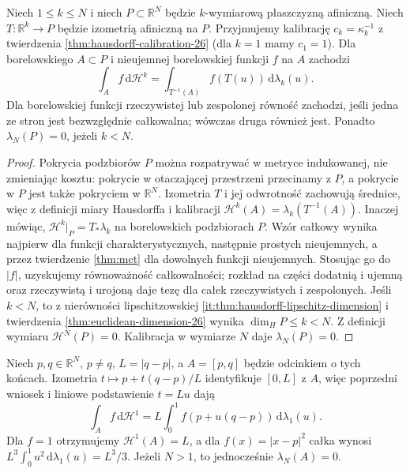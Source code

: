 \begin{wniosek}
\label{it:cor:hausdorff-affine-integration}
Niech $1\le k\le N$ i niech $P\subset\mathbb R^N$
będzie $k$-wymiarową płaszczyzną afiniczną.
Niech $T:\mathbb R^k\to P$ będzie izometrią afiniczną
na $P$. Przyjmujemy kalibrację
$c_k=\kappa_k^{-1}$ z twierdzenia
\ref{thm:hausdorff-calibration-26} (dla $k=1$ mamy $c_1=1$).
Dla borelowskiego $A\subset P$ i nieujemnej borelowskiej
funkcji $f$ na $A$ zachodzi
\[
 \int_A f\,\mathrm d\mathcal H^k
 =\int_{T^{-1}(A)} f(T(u))\,\mathrm d\lambda_k(u).
\]
Dla borelowskiej funkcji rzeczywistej lub zespolonej
równość zachodzi, jeśli jedna ze stron jest bezwzględnie
całkowalna; wówczas druga również jest.
Ponadto $\lambda_N(P)=0$, jeżeli $k<N$.
\end{wniosek}
\begin{proof}
Pokrycia podzbiorów $P$ można rozpatrywać w metryce
indukowanej, nie zmieniając kosztu: pokrycie w otaczającej
przestrzeni przecinamy z $P$, a pokrycie w $P$ jest
także pokryciem w $\mathbb R^N$.
Izometria $T$ i jej odwrotność zachowują średnice,
więc z definicji miary Hausdorffa i kalibracji
$\mathcal H^k(A)=\lambda_k(T^{-1}(A))$.
Inaczej mówiąc, $\mathcal H^k|_P=T_*\lambda_k$
na borelowskich podzbiorach $P$.
Wzór całkowy wynika najpierw dla funkcji charakterystycznych,
następnie prostych nieujemnych, a przez twierdzenie
\ref{thm:mct} dla dowolnych funkcji nieujemnych.
Stosując go do $|f|$, uzyskujemy równoważność
całkowalności; rozkład na części dodatnią i ujemną
oraz rzeczywistą i urojoną daje tezę dla całek
rzeczywistych i zespolonych.
Jeśli $k<N$, to z nierówności lipschitzowskiej
\ref{it:thm:hausdorff-lipschitz-dimension} i
twierdzenia \ref{thm:euclidean-dimension-26} wynika
$\dim_H P\le k<N$. Z definicji wymiaru
$\mathcal H^N(P)=0$. Kalibracja w wymiarze $N$
daje $\lambda_N(P)=0$.
\end{proof}

\begin{przyklad}
Niech $p,q\in\mathbb R^N$, $p\ne q$, $L=|q-p|$,
a $A=[p,q]$ będzie odcinkiem o tych końcach.
Izometria $t\mapsto p+t(q-p)/L$ identyfikuje
$[0,L]$ z $A$, więc poprzedni wniosek i liniowe
podstawienie $t=Lu$ dają
\[
 \int_A f\,\mathrm d\mathcal H^1
 =L\int_0^1 f(p+u(q-p))\,\mathrm d\lambda_1(u).
\]
Dla $f=1$ otrzymujemy $\mathcal H^1(A)=L$,
a dla $f(x)=|x-p|^2$ całka wynosi
$L^3\int_0^1u^2\,\mathrm d\lambda_1(u)=L^3/3$.
Jeżeli $N>1$, to jednocześnie $\lambda_N(A)=0$.
\end{przyklad}

